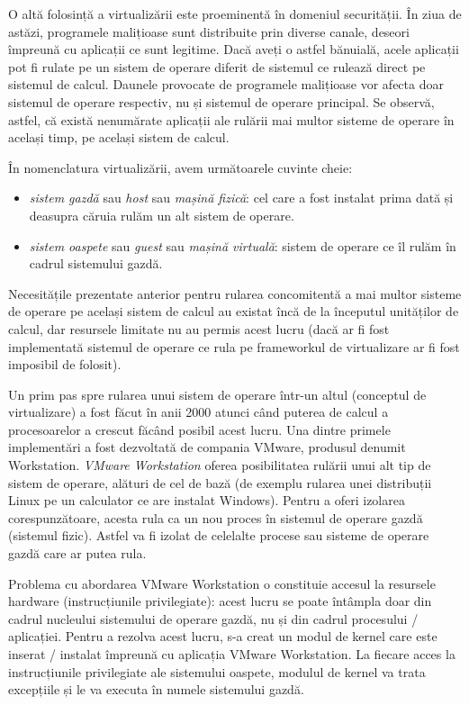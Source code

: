 O altă folosință a virtualizării este
proeminentă în domeniul securității. În ziua de astăzi, programele malițioase
sunt distribuite prin diverse canale, deseori împreună cu aplicații ce sunt
legitime. Dacă aveți o astfel bănuială, acele aplicații pot fi rulate pe un
sistem de operare diferit de sistemul ce rulează direct pe sistemul de calcul.
Daunele provocate de programele malițioase vor afecta doar sistemul de operare
respectiv, nu și sistemul de operare principal. Se observă, astfel, că există
nenumărate aplicații ale rulării mai multor sisteme de operare în același timp,
pe același sistem de calcul.

În nomenclatura virtualizării, avem următoarele cuvinte cheie:

\begin{itemize}
	\item \textit{sistem gazdă} sau \textit{host} sau \textit{mașină
		fizică}: cel care a fost instalat prima dată și deasupra căruia
		rulăm un alt sistem de operare.
	\item \textit{sistem oaspete} sau \textit{guest} sau \textit{mașină
		virtuală}: sistem de operare ce îl rulăm în cadrul sistemului
		gazdă.
\end{itemize}

Necesitățile prezentate anterior pentru rularea concomitentă a mai multor
sisteme de operare pe același sistem de calcul au existat încă de la începutul
unităților de calcul, dar resursele limitate nu au permis acest lucru (dacă ar
fi fost implementată sistemul de operare ce rula pe frameworkul de virtualizare
ar fi fost imposibil de folosit).

Un prim pas spre rularea unui sistem de operare
într-un altul (conceptul de virtualizare) a fost făcut în anii 2000 atunci când
puterea de calcul a procesoarelor a crescut făcând posibil acest lucru. Una
dintre primele implementări a fost dezvoltată de compania VMware, produsul
denumit Workstation. \textit{VMware Workstation} oferea posibilitatea rulării
unui alt tip de sistem de operare, alături de cel de bază (de exemplu rularea
unei distribuții Linux pe un calculator ce are instalat Windows). Pentru a oferi
izolarea corespunzătoare, acesta rula ca un nou proces în sistemul de operare
gazdă (sistemul fizic). Astfel va fi izolat de celelalte procese sau sisteme de
operare gazdă care ar putea rula.

Problema cu abordarea VMware Workstation o constituie
accesul la resursele hardware (instrucțiunile privilegiate): acest lucru se
poate întâmpla doar din cadrul nucleului sistemului de operare gazdă, nu și din
cadrul procesului / aplicației. Pentru a rezolva acest lucru, s-a creat un modul de
kernel care este inserat / instalat împreună cu aplicația VMware Workstation. La
fiecare acces la instrucțiunile privilegiate ale sistemului oaspete, modulul de
kernel va trata excepțiile și le va executa în numele sistemului gazdă.


